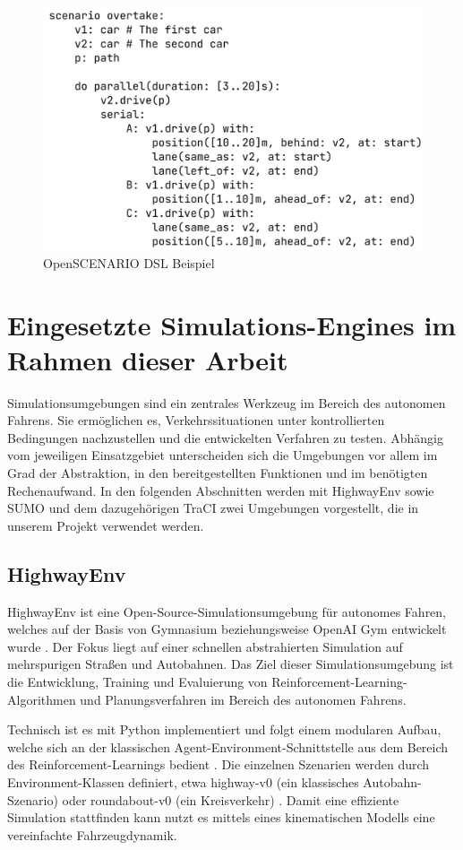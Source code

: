 \begin{figure}[h]
    \centering
    \includegraphics[width=0.6\linewidth]{contents/figures/openscenario_dsl.png}
    \caption{OpenSCENARIO DSL Beispiel \cite{EinfuehrungIntegrationsprojekt}}
    \label{fig:osl-dsl}
\end{figure}

\section{Eingesetzte Simulations-Engines im Rahmen dieser Arbeit}
Simulationsumgebungen sind ein zentrales Werkzeug im Bereich des autonomen Fahrens. Sie ermöglichen es, Verkehrssituationen unter kontrollierten Bedingungen nachzustellen und die entwickelten Verfahren zu testen. Abhängig vom jeweiligen Einsatzgebiet unterscheiden sich die Umgebungen vor allem im Grad der Abstraktion, in den bereitgestellten Funktionen und im benötigten Rechenaufwand. In den folgenden Abschnitten werden mit HighwayEnv sowie SUMO und dem dazugehörigen TraCI zwei Umgebungen vorgestellt, die in unserem Projekt verwendet werden.
\subsection{HighwayEnv}
HighwayEnv ist eine Open-Source-Simulationsumgebung für autonomes Fahren, welches auf der Basis von Gymnasium beziehungsweise OpenAI Gym entwickelt wurde \cite{highway-env}. Der Fokus liegt auf einer schnellen abstrahierten Simulation auf mehrspurigen Straßen und Autobahnen. Das Ziel dieser Simulationsumgebung ist die Entwicklung, Training und Evaluierung von Reinforcement-Learning-Algorithmen und Planungsverfahren im Bereich des autonomen Fahrens.

Technisch ist es mit Python implementiert und folgt einem modularen Aufbau, welche sich an der klassischen Agent-Environment-Schnittstelle aus dem Bereich des Reinforcement-Learnings bedient \cite{highway-env}. Die einzelnen Szenarien werden durch Environment-Klassen definiert, etwa highway-v0 (ein klassisches Autobahn-Szenario) oder roundabout-v0 (ein Kreisverkehr) \cite{highway-env}. Damit eine effiziente Simulation stattfinden kann nutzt es mittels eines kinematischen Modells eine vereinfachte Fahrzeugdynamik.

